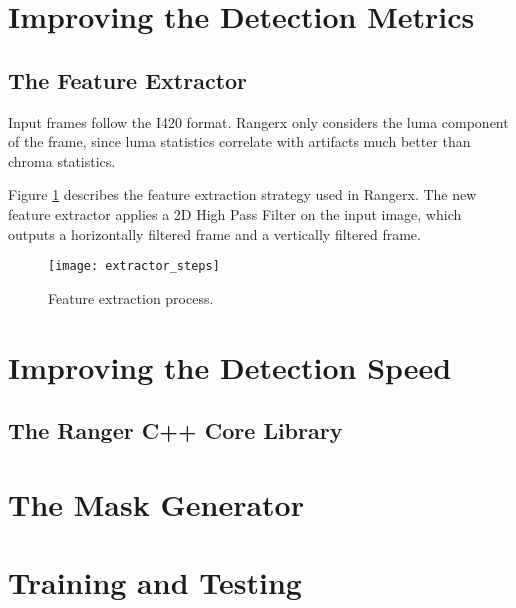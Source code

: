 \section{Improving the Detection Metrics}
\label{sec:sol_metrics}

\subsection{The Feature Extractor}
\label{sec:sol_features}

Input frames follow the I420 format. Rangerx only considers the luma component of the frame, since luma statistics correlate with artifacts much better than chroma statistics.

Figure \ref{fig:extractor_steps} describes the feature extraction strategy used in Rangerx. The new feature extractor applies a 2D High Pass Filter on the input image, which outputs a horizontally filtered frame and a vertically filtered frame.

\begin{figure} [!h]
  \centering
  
  \texttt{[image: extractor\_steps]}
  
  \caption{Feature extraction process. }
  \label{fig:extractor_steps}

\end{figure}

\section{Improving the Detection Speed}
\label{sec:sol_speed}

\subsection{The Ranger C++ Core Library}
\label{sec:sol_rdf}

\section{The Mask Generator}
\label{sec:sol_maskgen}

\section{Training and Testing}
\label{sec:sol_traintest}


